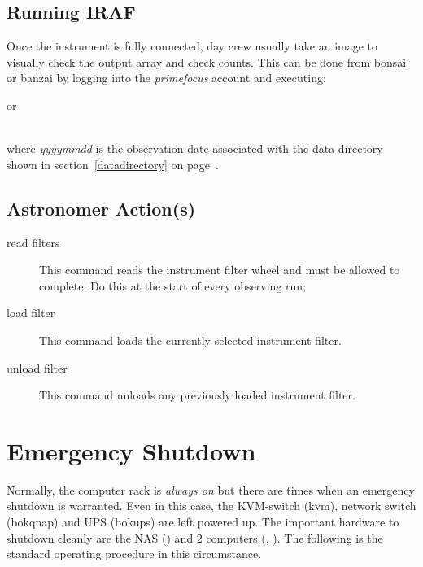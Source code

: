 \documentclass[12pt,twoside]{article}
\begin{document}
\subsection{Running IRAF}
\label{Running IRAF}
Once the instrument is fully connected, day crew usually take an image to visually check the output array and check counts. This can be done
from {\sfmagenta bonsai} or {\sfmagenta banzai} by logging into the \emph{primefocus} account and executing: \\



\noindent or

 \\

where \emph{yyyymmdd} is the observation date associated with the data directory shown in section~\ref{datadirectory} on page~\pageref{datadirectory}.

\subsection{Astronomer Action(s)}
\label{astronomeractions}

\begin{description}
 \item[{\sc read filters}] This command reads the instrument filter wheel and must be allowed to complete. Do this at the start of every observing run;
 \item[{\sc load filter}] This command loads the currently selected instrument filter.
 \item[{\sc unload filter}] This command unloads any previously loaded instrument filter.
\end{description}

\section{Emergency Shutdown}
\label{Emergency Shutdown}

Normally, the computer rack is \emph{always on} but there are times when an emergency shutdown is warranted. Even in this case, 
the KVM-switch (kvm), network switch (bokqnap) and UPS (bokups) are left powered up. The important hardware to shutdown cleanly 
are the NAS () and 2 computers (, ). The following is the standard operating
procedure in this circumstance.
\end{document}
